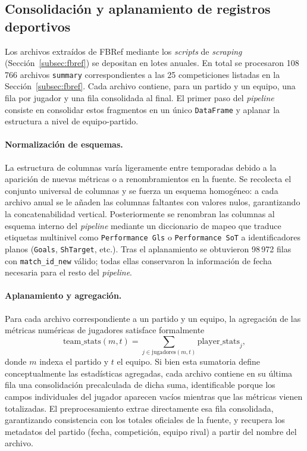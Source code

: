 \subsection{Consolidaci\'on y aplanamiento de registros deportivos}
\label{subsec:aplanamiento}

Los archivos extra\'idos de FBRef mediante los \textit{scripts} de \textit{scraping} (Secci\'on~\ref{subsec:fbref}) se depositan en lotes anuales. En total se procesaron 108\,766 archivos \texttt{summary} correspondientes a las 25 competiciones listadas en la Secci\'on~\ref{subsec:fbref}. Cada archivo contiene, para un partido y un equipo, una fila por jugador y una fila consolidada al final. El primer paso del \textit{pipeline} consiste en consolidar estos fragmentos en un \'unico \texttt{DataFrame} y aplanar la estructura a nivel de equipo-partido.

\paragraph{Normalizaci\'on de esquemas.} La estructura de columnas var\'ia ligeramente entre temporadas debido a la aparici\'on de nuevas m\'etricas o a renombramientos en la fuente. Se recolecta el conjunto universal de columnas y se fuerza un esquema homog\'eneo: a cada archivo anual se le a\~naden las columnas faltantes con valores nulos, garantizando la concatenabilidad vertical. Posteriormente se renombran las columnas al esquema interno del \textit{pipeline} mediante un diccionario de mapeo que traduce etiquetas multinivel como \texttt{Performance~Gls} o \texttt{Performance~SoT} a identificadores planos (\texttt{Goals}, \texttt{ShTarget}, etc.). Tras el aplanamiento se obtuvieron 98\,972 filas con \texttt{match\_id\_new} v\'alido; todas ellas conservaron la informaci\'on de fecha necesaria para el resto del \textit{pipeline}.

\paragraph{Aplanamiento y agregaci\'on.} Para cada archivo correspondiente a un partido y un equipo, la agregaci\'on de las m\'etricas num\'ericas de jugadores satisface formalmente
\begin{equation}
	\text{team\_stats}(m,t) = \sum_{j \in \text{jugadores}(m,t)} 
	\text{player\_stats}_j,
\end{equation}
donde $m$ indexa el partido y $t$ el equipo. Si bien esta sumatoria define conceptualmente las estad\'isticas agregadas, cada archivo contiene en su \'ultima fila una consolidaci\'on precalculada de dicha suma, identificable porque los campos individuales del jugador aparecen vac\'ios mientras que las m\'etricas vienen totalizadas. El preprocesamiento extrae directamente esa fila consolidada, garantizando consistencia con los totales oficiales de la fuente, y recupera los metadatos del partido (fecha, competici\'on, equipo rival) a partir del nombre del archivo.


